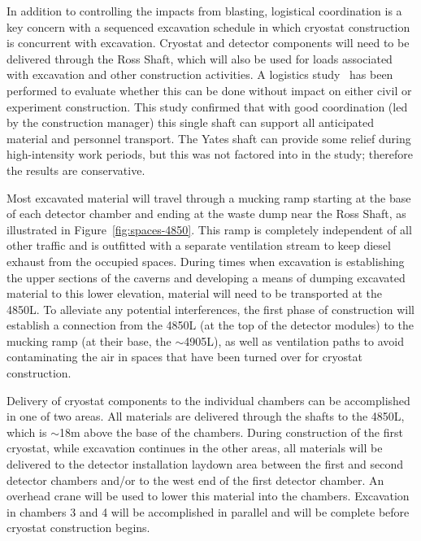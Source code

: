 In addition to controlling the impacts from blasting, logistical coordination is a key concern with a sequenced excavation schedule in which cryostat construction is concurrent with excavation. %
Cryostat and detector components will need to be delivered through the Ross Shaft, which will also be used for loads associated with excavation and other construction activities. A logistics study~\cite{lbnf-logistics} has been performed to evaluate whether this can be done without impact on either civil or experiment construction.  This study confirmed that with good coordination (led by the construction manager) this single shaft can support all anticipated material and personnel transport. %
The Yates shaft can provide some relief during high-intensity work periods, but this was not factored into %
in the study; therefore the results are conservative. %

Most excavated material will travel through a mucking ramp starting at the base of each detector chamber and ending at the waste dump near the Ross Shaft, as illustrated in Figure~\ref{fig:spaces-4850}. This %
ramp is completely independent of all other traffic and is outfitted with %
a separate ventilation stream to keep diesel exhaust from %
the occupied spaces. During times when excavation is establishing the upper sections of the caverns and developing a means of dumping excavated material to this lower elevation, material will need to be transported at the 4850L. %
 To alleviate any potential interferences, the first phase of construction will establish a connection from the 4850L (at the top of the detector modules) to the mucking ramp (at their base, the $\sim$4905L), as well as ventilation paths to avoid contaminating the air in spaces that have been turned over for cryostat construction. 

Delivery of cryostat components to the individual chambers can be accomplished in one of two areas. 
All materials are delivered through the shafts to the 4850L, which is $\sim$18m above the base of the chambers. During construction of the first cryostat, while excavation continues in the other areas, all materials will be delivered to the detector installation laydown area between the first and second detector chambers and/or to the west end of the first detector chamber. An overhead crane will be used to lower this material into the chambers. Excavation in chambers 3 and 4 will be accomplished in parallel and will be complete before cryostat construction begins. %

